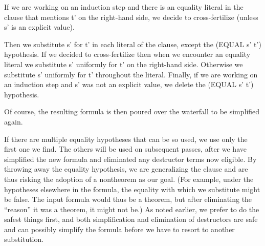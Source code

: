 \documentclass[11pt]{book}
\begin{document}
If we are working on an induction step and there is an equality literal in
the clause that mentions t' on the right-hand side,
we decide to cross-fertilize (unless s' is an explicit value).

Then we substitute s' for t' in each literal of the clause, except the
(EQUAL s' t') hypothesis.  If we decided to cross-fertilize
then when we encounter an equality literal we substitute s' uniformly for t' on
the right-hand side.  Otherwise we substitute s' uniformly for t' throughout the literal.
Finally, if we are working on an induction step and s' was
not an explicit value, we delete the (EQUAL s' t') hypothesis.

Of course, the resulting formula is then poured over the
waterfall to be simplified again.

If there are multiple equality hypotheses that can be so used, we
use only the first one we find.  The others will be used on subsequent
passes, after we have  simplified the new formula and
eliminated any destructor terms  now eligible.
By throwing away the equality hypothesis, we are generalizing
the clause and are thus risking the adoption of a nontheorem as our
goal.  (For example, under the hypotheses elsewhere in the formula,
the equality with which we substitute might be false.  The input formula
would thus be a theorem, but after eliminating the ``reason'' it was
a theorem, it might not be.)
As noted earlier, we prefer to do the safest things first,
and both simplification and elimination of destructors are safe and
can possibly simplify the formula before we have to resort to
another substitution.
\end{document}
